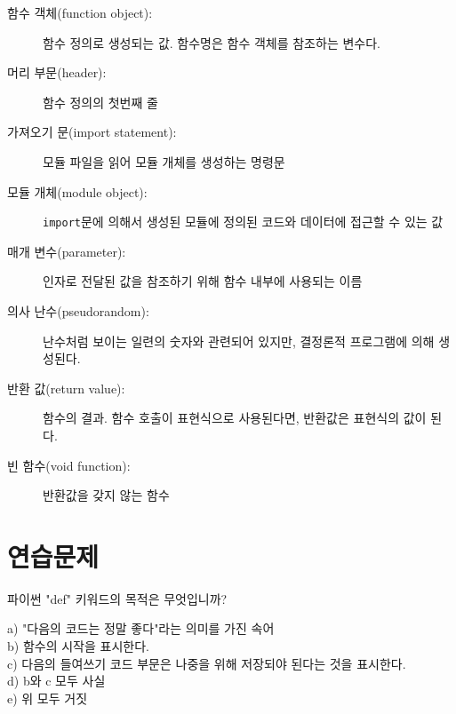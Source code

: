 \begin{description}
\item[함수 객체(function object):] 함수 정의로 생성되는 값. 함수명은 함수 객체를 참조하는 변수다.

\item[머리 부문(header):] 함수 정의의 첫번째 줄

\item[가져오기 문(import statement):] 모듈 파일을 읽어 모듈 개체를 생성하는 명령문

\item[모듈 개체(module object):] {\tt import}문에 의해서 생성된 모듈에 정의된 코드와 데이터에 접근할 수 있는 값

\item[매개 변수(parameter):] 인자로 전달된 값을 참조하기 위해 함수 내부에 사용되는 이름

\item[의사 난수(pseudorandom):] 난수처럼 보이는 일련의 숫자와 관련되어 있지만, 결정론적 프로그램에 의해 생성된다.

\item[반환 값(return value):] 함수의 결과. 함수 호출이 표현식으로 사용된다면, 반환값은 표현식의 값이 된다. 

\item[빈 함수(void function):] 반환값을 갖지 않는 함수

\end{description}


\section{연습문제}

\begin{ex}
파이썬 "def" 키워드의 목적은 무엇입니까?

a) "다음의 코드는 정말 좋다"라는 의미를 가진 속어\\
b) 함수의 시작을 표시한다.\\
c) 다음의 들여쓰기 코드 부문은 나중을 위해 저장되야 된다는 것을 표시한다.\\
d) b와 c 모두 사실\\
e) 위 모두 거짓
\end{ex}

